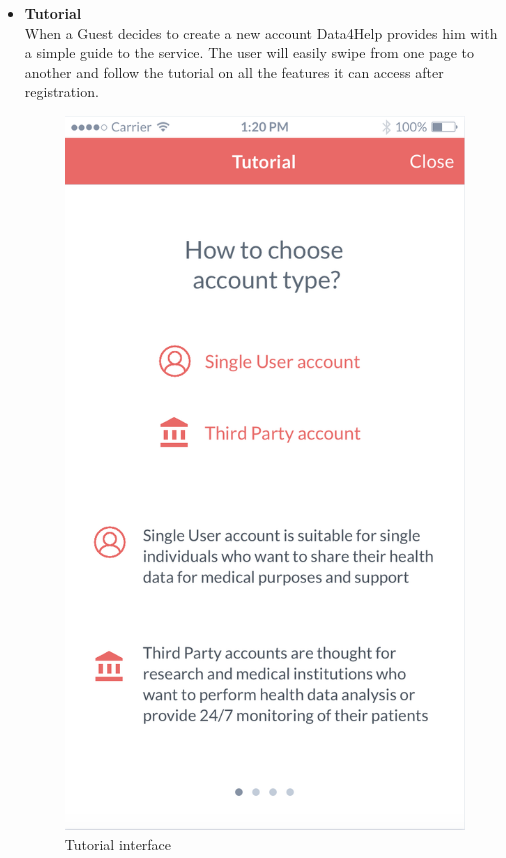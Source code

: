 \documentclass[titlepage]{article}
\begin{document}
\begin{itemize}
\begin{itemize}
				\item{\bf Tutorial}\\
				When a Guest decides to create a new account Data4Help provides him with a simple guide to the service. The user will easily swipe from one page to another and follow the tutorial on all the features it can access after registration. \\
					\begin{figure}[H]
						\center
  						\includegraphics[width=0.5\columnwidth]{Mockup/mockupTutorial.png}
  						\caption{Tutorial interface}
 					 	\label{fig:Tutorial}
					\end{figure}


\end{itemize}
\end{itemize}
\end{document}
